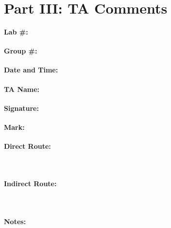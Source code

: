 \documentclass[10pt]{article}
\begin{document}
\section*{Part III: TA Comments}

\paragraph{Lab \#:}
\paragraph{Group \#:}
\paragraph{Date and Time:}

\paragraph{TA Name:}
\paragraph{Signature:}

\paragraph{Mark:}

\paragraph{Direct Route:}~\\[3em]

\paragraph{Indirect Route:}~\\[3em]

\paragraph{Notes:}
\end{document}
